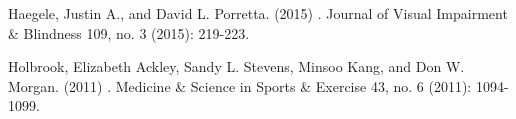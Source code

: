 \documentclass[11pt]{article}
\begin{document}
\begin{thebibliography}{}
Haegele, Justin A., and David L. Porretta.
\newblock (2015)
.
\newblock Journal of Visual Impairment \& Blindness 109, no. 3 (2015): 219-223.

Holbrook, Elizabeth Ackley, Sandy L. Stevens, Minsoo Kang, and Don W. Morgan.
\newblock (2011)
.
\newblock Medicine \& Science in Sports \& Exercise 43, no. 6 (2011): 1094-1099.




\end{thebibliography}
\end{document}
